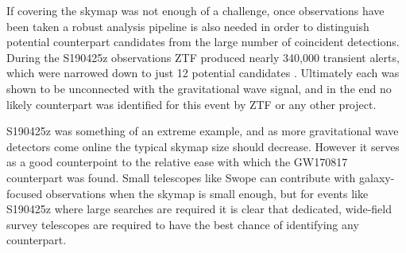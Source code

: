 \begin{colsection}
\begin{colsection}
If covering the skymap was not enough of a challenge, once observations have been taken a robust analysis pipeline is also needed in order to distinguish potential counterpart candidates from the large number of coincident detections. During the S190425z observations ZTF produced nearly 340,000 transient alerts, which were narrowed down to just 12 potential candidates \citep{GW190425_ZTF}. Ultimately each was shown to be unconnected with the gravitational wave signal, and in the end no likely counterpart was identified for this event by ZTF or any other project.

S190425z was something of an extreme example, and as more gravitational wave detectors come online the typical skymap size should decrease. However it serves as a good counterpoint to the relative ease with which the GW170817 counterpart was found. Small telescopes like Swope can contribute with galaxy-focused observations when the skymap is small enough, but for events like S190425z where large searches are required it is clear that dedicated, wide-field survey telescopes are required to have the best chance of identifying any counterpart.

\end{colsection}


\end{colsection}

\clearpage
\newpage
\hfuzz=6pt %
